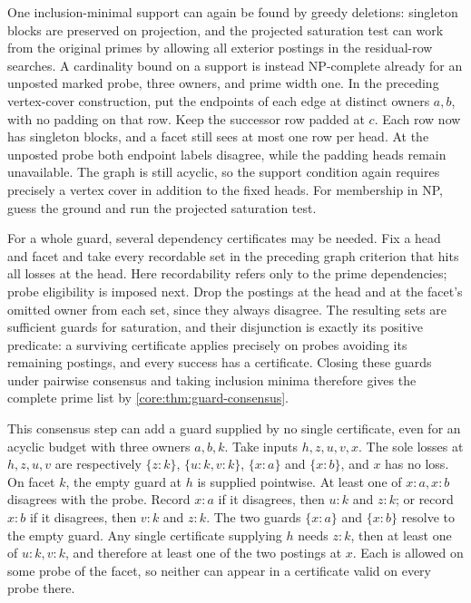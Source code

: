 One inclusion-minimal support can again be
found by greedy deletions: singleton blocks
are preserved on projection, and the
projected saturation test can work from the
original primes by allowing all exterior
postings in the residual-row searches.
A cardinality bound on a support is instead
NP-complete already for an unposted marked
probe, three owners, and prime width one.
In the preceding vertex-cover construction,
put the endpoints of each edge at distinct
owners $a,b$, with no padding on that row.
Keep the successor row padded at $c$.
Each row now has singleton blocks, and a
facet still sees at most one row per head.
At the unposted probe both endpoint labels
disagree, while the padding heads remain
unavailable. The graph is still acyclic,
so the support condition again requires
precisely a vertex cover in addition to the
fixed heads. For membership in NP, guess
the ground and run the projected saturation
test.

For a whole guard, several dependency certificates
may be needed. Fix a head and facet and take every
recordable set in the preceding graph criterion
that hits all losses at the head. Here recordability
refers only to the prime dependencies; probe
eligibility is imposed next. Drop the postings at
the head and at the facet's omitted owner from
each set, since they always disagree. The resulting
sets are sufficient guards for saturation, and
their disjunction is exactly its positive predicate:
a surviving certificate applies precisely on probes
avoiding its remaining postings, and every success
has a certificate. Closing these guards under
pairwise consensus and taking inclusion minima
therefore gives the complete prime list by
\cref{core:thm:guard-consensus}.

This consensus step can add a guard supplied by
no single certificate, even for an acyclic budget
with three owners $a,b,k$. Take inputs $h,z,u,v,x$.
The sole losses at $h,z,u,v$ are respectively
$\{z:k\}$, $\{u:k,v:k\}$, $\{x:a\}$ and
$\{x:b\}$, and $x$ has no loss. On facet $k$,
the empty guard at $h$ is supplied pointwise.
At least one of $x:a,x:b$ disagrees with the probe.
Record $x:a$ if it disagrees, then $u:k$ and
$z:k$; or record $x:b$ if it disagrees, then
$v:k$ and $z:k$. The two guards $\{x:a\}$ and
$\{x:b\}$ resolve to the empty guard. Any
single certificate supplying $h$ needs $z:k$,
then at least one of $u:k,v:k$, and therefore
at least one of the two postings at $x$.
Each is allowed on some probe of the facet, so
neither can appear in a certificate valid on
every probe there.

